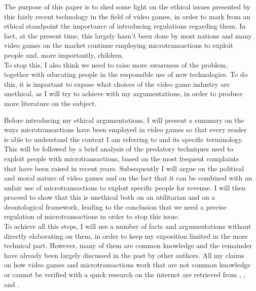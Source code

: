 \documentclass[10pt,a4paper]{article}
\begin{document}
The purpose of this paper is to shed some light on the ethical issues presented by this fairly recent technology in the field of video games, in order to mark from an ethical standpoint the importance of introducing regulations regarding them.
In fact, at the present time, this largely hasn't been done by most nations and many video games on the market continue employing microtransactions to exploit people and, more importantly, children.\\
To stop this, I also think we need to raise more awareness of the problem, together with educating people in the responsible use of new technologies.
To do this, it is important to expose what choices of the video game industry are unethical, as I will try to achieve with my argumentations, in order to produce more literature on the subject.

Before introducing my ethical argumentations, I will present a summary on the ways microtransactions have been employed in video games so that every reader is able to understand the context I am referring to and its specific terminology.
This will be followed by a brief analysis of the predatory techniques used to exploit people with microtransactions, based on the most frequent complaints that have been raised in recent years.
Subsequently I will argue on the political and moral nature of video games and on the fact that it can be combined with an unfair use of microtransactions to exploit specific people for revenue.
I will then proceed to show that this is unethical both on an utilitarian and on a deontological framework, leading to the conclusion that we need a precise regulation of microtransactions in order to stop this issue.\\
To achieve all this steps, I will use a number of facts and argumentations without directly elaborating on them, in order to keep my exposition limited in the more technical part.
However, many of them are common knowledge and the remainder have already been largely discussed in the past by other authors.
All my claims on how video games and microtransactions work that are not common knowledge or cannot be verified with a quick research on the internet are retrieved from \parencite{ukparliament}, \parencite{microtrans}, \parencite{psych} and \parencite{pzone}.
%
\end{document}

